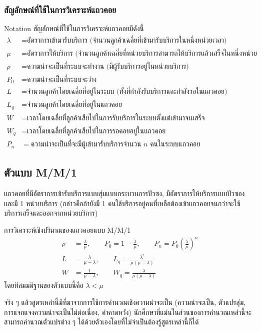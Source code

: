 \subsubsection{สัญลักษณ์ที่ใช้ในการวิเคราะห์แถวคอย}
\begin{definition}[breakable]
	{Notation}{}
	สัญลักษณ์ที่ใช้ในการวิเคราะห์แถวคอยมีดังนี้
	\begin{align*}
		\lambda &= \text{อัตราการเข้ามารับบริการ (จำนวนลูกค้าเฉลี่ยที่เข้ามารับบริการในหนึ่งหน่วยเวลา)}\\
		\mu &= \text{อัตราการให้บริการ (จำนวนลูกค้าเฉลี่ยที่หน่วยบริการสามารถให้บริการแล้วเสร็จในหนึ่งหน่วยเวลา)}\\
		\rho &= \text{ความน่าจะเป็นที่ระบบจะทำงาน (มีผู้รับบริการอยู่ในหน่วยบริการ)}\\
		P_0 &= \text{ความน่าจะเป็นที่ระบบจะว่าง}\\
		L &= \text{จำนวนลูกค้าโดยเฉลี่ยที่อยู่ในระบบ (ทั้งที่กำลังรับบริการและกำลังรอในแถวคอย)}\\
		L_q &= \text{จำนวนลูกค้าโดยเฉลี่ยที่อยู่ในแถวคอย}\\
		W &= \text{เวลาโดยเฉลี่ยที่ลูกค้าเสียไปในการรับบริการในระบบตั้งแต่เข้ามาจนเสร็จ}\\
		W_q &= \text{เวลาโดยเฉลี่ยที่ลูกค้าเสียไปในการรอคอยอยู่ในแถวคอย}\\
		P_n &= \text{ความน่าจะเป็นที่จะมีผู้เข้ามารับบริการจำนวน $n$ คนในระบบแถวคอย}
	\end{align*}
\end{definition}
\subsection{ตัวแบบ M/M/1}
แถวคอยที่มีอัตราการเข้ารับบริการแบบสุ่มแบบกระบวนการปัวซง, มีอัตราการให้บริการแบบปัวซอง และมี 1 หน่วยบริการ (กล่าวคือถ้ายังมี 1 คนใช้บริการอยู่คนที่เหลือต้องเข้าแถวคอยจนกว่าจะใช้บริการเสร็จและออกจากหน่วยบริการ)
\begin{theorem}
	{การวิเคราะห์เชิงปริมาณของแถวคอยแบบ M/M/1}{}
	\begin{align*}
		\rho &= \frac{\lambda}{\mu}, \qquad P_0 = 1 - \frac{\lambda}{\mu}, \qquad P_n = P_0\left(\frac{\lambda}{\mu}\right)^n \\
		L &= \frac{\lambda}{\mu - \lambda}, \qquad L_q = \frac{\lambda^2}{\mu (\mu - \lambda)} \\
		W &= \frac{1}{\mu - \lambda}, \qquad W_q = \frac{\lambda}{\mu(\mu - \lambda)}
	\end{align*}
	โดยทีสมมติฐานของตัวแบบนี้คือ $\lambda < \mu$
\end{theorem}
จริง ๆ แล้วสูตรเหล่านี้มีที่มาจากการใช้การคำนวณเชิงความน่าจะเป็น (ความน่าจะเป็น, ตัวแปรสุ่ม, การแจกแจงความน่าจะเป็นไม่ต่อเนื่อง, ค่าคาดหวัง) นักศึกษาที่แม่นในส่วนของการคำนวณเหล่านี้จะสามารถคำนวณตัวแปรต่าง ๆ ได้ด้วยตัวเองโดยที่ไม่จำเป็นต้องรู้สูตรเหล่านี้ก็ได้

